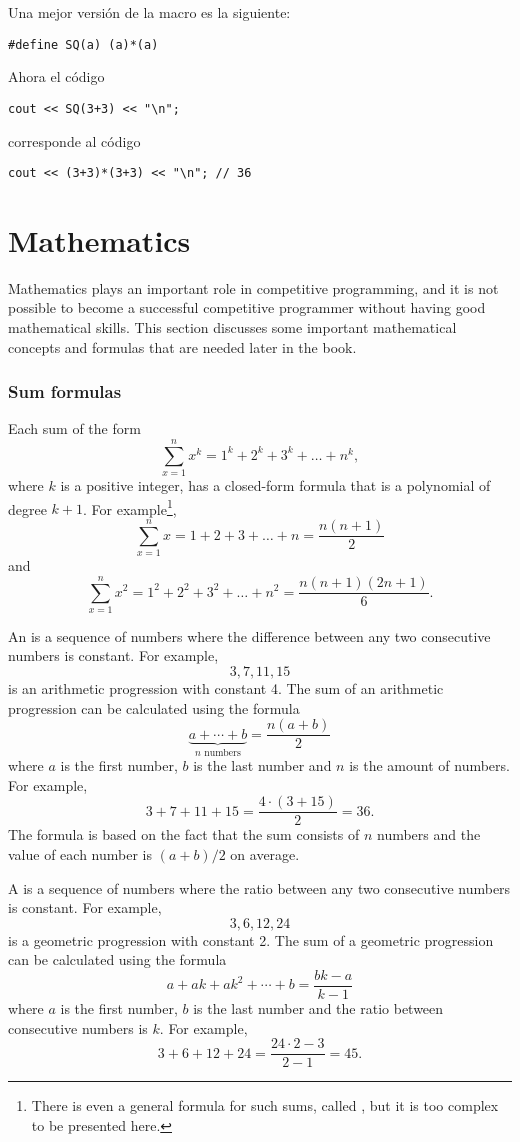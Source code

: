 Una mejor versión de la macro es la siguiente:
\begin{lstlisting}
#define SQ(a) (a)*(a)
\end{lstlisting}
Ahora el código
\begin{lstlisting}
cout << SQ(3+3) << "\n";
\end{lstlisting}
corresponde al código
\begin{lstlisting}
cout << (3+3)*(3+3) << "\n"; // 36
\end{lstlisting}


\section{Mathematics}

Mathematics plays an important role in competitive
programming, and it is not possible to become
a successful competitive programmer without
having good mathematical skills.
This section discusses some important
mathematical concepts and formulas that
are needed later in the book.

\subsubsection{Sum formulas}

Each sum of the form
\[\sum_{x=1}^n x^k = 1^k+2^k+3^k+\ldots+n^k,\]
where $k$ is a positive integer,
has a closed-form formula that is a
polynomial of degree $k+1$.
For example\footnote{
There is even a general formula for such sums, called ,
but it is too complex to be presented here.},
\[\sum_{x=1}^n x = 1+2+3+\ldots+n = \frac{n(n+1)}{2}\]
and
\[\sum_{x=1}^n x^2 = 1^2+2^2+3^2+\ldots+n^2 = \frac{n(n+1)(2n+1)}{6}.\]

An  is a 
sequence of numbers
where the difference between any two consecutive
numbers is constant.
For example,
\[3, 7, 11, 15\]
is an arithmetic progression with constant 4.
The sum of an arithmetic progression can be calculated
using the formula
\[\underbrace{a + \cdots + b}_{n \,\, \textrm{numbers}} = \frac{n(a+b)}{2}\]
where $a$ is the first number,
$b$ is the last number and
$n$ is the amount of numbers.
For example,
\[3+7+11+15=\frac{4 \cdot (3+15)}{2} = 36.\]
The formula is based on the fact
that the sum consists of $n$ numbers and
the value of each number is $(a+b)/2$ on average.

A  is a sequence
of numbers
where the ratio between any two consecutive
numbers is constant.
For example,
\[3,6,12,24\]
is a geometric progression with constant 2.
The sum of a geometric progression can be calculated
using the formula
\[a + ak + ak^2 + \cdots + b = \frac{bk-a}{k-1}\]
where $a$ is the first number,
$b$ is the last number and the
ratio between consecutive numbers is $k$.
For example,
\[3+6+12+24=\frac{24 \cdot 2 - 3}{2-1} = 45.\]

